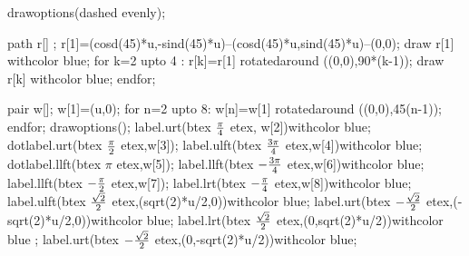 \documentclass[12pt]{article}
\begin{document}



  drawoptions(dashed evenly);

  path r[] ;
  r[1]=(cosd(45)*u,-sind(45)*u)--(cosd(45)*u,sind(45)*u)--(0,0);
  draw r[1] withcolor blue;
  for k=2 upto 4 : r[k]=r[1] rotatedaround ((0,0),90*(k-1));
    draw r[k] withcolor blue;
  endfor;

  pair w[];
  w[1]=(u,0);
  for n=2 upto 8:
    w[n]=w[1] rotatedaround ((0,0),45(n-1));
  endfor;
  drawoptions();
  label.urt(btex ${\pi \over 4}$ etex, w[2])withcolor blue;
  dotlabel.urt(btex ${\pi \over 2}$ etex,w[3]);
  label.ulft(btex ${3\pi \over 4}$ etex,w[4])withcolor blue;
 dotlabel.llft(btex ${\pi}$ etex,w[5]);
  label.llft(btex $-{3\pi \over 4}$ etex,w[6])withcolor blue;
  label.llft(btex $-{\pi \over 2}$ etex,w[7]);
  label.lrt(btex $-{\pi \over 4}$ etex,w[8])withcolor blue;
  label.ulft(btex ${\sqrt{2} \over 2}$ etex,(sqrt(2)*u/2,0))withcolor blue;
  label.urt(btex $-{\sqrt{2} \over 2}$ etex,(-sqrt(2)*u/2,0))withcolor blue;
  label.lrt(btex ${\sqrt{2} \over 2}$ etex,(0,sqrt(2)*u/2))withcolor blue ;
  label.urt(btex $-{\sqrt{2} \over 2}$ etex,(0,-sqrt(2)*u/2))withcolor blue;
\end{document}
